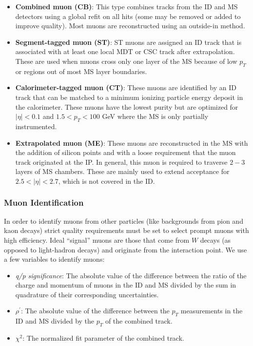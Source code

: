 \begin{itemize}
\item \textbf{Combined muon (CB)}: This type combines tracks from the ID and MS detectors using a global refit on all hits (some may be removed or added to improve quality). Most muons are reconstructed using an outside-in method. 
\item \textbf{Segment-tagged muon (ST)}: ST muons are assigned an ID track that is associated with at least one local MDT or CSC track after extrapolation. These are used when muons cross only one layer of the MS because of low $p_T$ or regions out of most MS layer boundaries. 
\item \textbf{Calorimeter-tagged muon (CT)}: These muons are identified by an ID track that can be matched to a minimum ionizing particle energy deposit in the calorimeter. These muons have the lowest purity but are optimized for $|\eta|  < 0.1$ and $1.5 < p_T < 100$ GeV where the MS is only partially instrumented. 
\item \textbf{Extrapolated muon (ME)}: These muons are reconstructed in the MS with the addition of silicon points and with a loose requirement that the muon track originated at the IP. In general, this muon is required to traverse $2-3$ layers of MS chambers. These are mainly used to extend acceptance for $2.5 < |\eta| < 2.7$, which is not covered in the ID. 
\end{itemize}

\subsubsection{Muon Identification}
In order to identify muons from other particles (like backgrounds from pion and kaon decays) strict quality requirements must be set to select prompt muons with high efficiency. Ideal ``signal'' muons are those that come from $W$ decays (as opposed to light-hadron decays) and originate from the interaction point. We use a few variables to identify muons:
\begin{itemize}
\item \textit{q/p significance}: The absolute value of the difference between the ratio of the charge and momentum of muons in the ID and MS divided by the sum in quadrature of their corresponding uncertainties.
\item \textit{$\rho^\prime$}: The absolute value of the difference between the $p_T$ measurements in the ID and MS divided by the $p_T$ of the combined track. 
\item \textit{$\chi ^2$}: The normalized fit parameter of the combined track.
\end{itemize}

